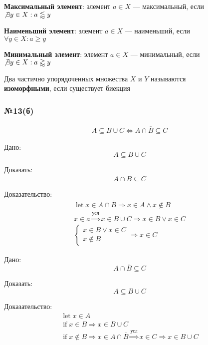 \documentclass{article}
\DeclareMathOperator*{\Let}{let}
\DeclareMathOperator*{\If}{if}
\begin{document}
\textbf{Максимальный элемент}: элемент $a \in X$ --- максимальный, если \\
$\not \exists y \in X : a \lessapprox y$

\textbf{Наименьший элемент}: элемент $a \in X$ --- наименьший, если \\
$\forall y \in X : a \ge y$

\textbf{Минимальный элемент}: элемент $a \in X$ --- минимальный, если \\
$\not \exists y \in X : a \gtrapprox y$

Два частично упорядоченных множества $X$ и $Y$ называются \\
\textbf{изоморфными}, если существует биекция

\subsubsection*{№13(б)}

\begin{gather*}
	A \subseteq B \cup C \Leftrightarrow A \cap \overline{B} \subseteq C
\end{gather*}

{\large Дано:}
\[ A \subseteq B \cup C \]

{\large Доказать:}
\[ A \cap \overline{B} \subseteq C \]

{\large Доказательство:}
\begin{gather*}
	\Let x \in A \cap \overline{B} \Rightarrow x \in A \land x \not \in B \\
	x \in a \stackrel{\text{усл}}{\Rightarrow} x \in B \cup C \Rightarrow x \in B \lor x \in C \\
	\begin{cases}
		x \in B \lor x \in C \\
		x \not \in B
	\end{cases} \Rightarrow x \in C
\end{gather*}

{\large Дано:}
\[ A \cap \overline{B} \subseteq C \]

{\large Доказать:}
\[ A \subseteq B \cup C \]

{\large Доказательство:}
\begin{gather*}
	\Let x \in A \\
	\If x \in B \Rightarrow x \in B \cup C \\
	\If x \not \in B \Rightarrow x \in A \cap \overline{B} \stackrel{\text{усл}}{\Rightarrow} x \in C \Rightarrow x \in B \cup C
\end{gather*}
\end{document}
